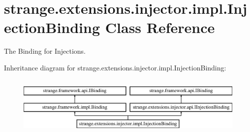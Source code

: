 \hypertarget{classstrange_1_1extensions_1_1injector_1_1impl_1_1_injection_binding}{\section{strange.\-extensions.\-injector.\-impl.\-Injection\-Binding Class Reference}
\label{classstrange_1_1extensions_1_1injector_1_1impl_1_1_injection_binding}
}


The Binding for Injections.  


Inheritance diagram for strange.\-extensions.\-injector.\-impl.\-Injection\-Binding\-:\begin{figure}[H]
\begin{center}
\leavevmode
\includegraphics[height=2.896552cm]{classstrange_1_1extensions_1_1injector_1_1impl_1_1_injection_binding}
\end{center}
\end{figure}
